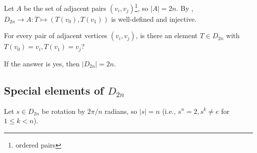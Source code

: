 \begin{pf}
Let $A$ be the set of adjacent pairs $(v_i,v_j)$\footnote{ordered pairs}, so $|A|=2n$. By , $D_{2n}\to A: T\mapsto (T(v_0),T(v_1))$ is well-defined and injective.
\end{pf}

For every pair of adjacent vertices $(v_i,v_j)$, is there an element $T\in D_{2n}$ with $T(v_0)=v_i, T(v_1)=v_j$?

If the answer is yes, then $|D_{2n}|=2n$.

\subsection{Special elements of $D_{2n}$}
Let $s\in D_{2n}$ be rotation by $2\pi/n$ radians, so $|s|=n$ (i.e., $s^n=2, s^k\ne e$ for $1\le k <n$).

